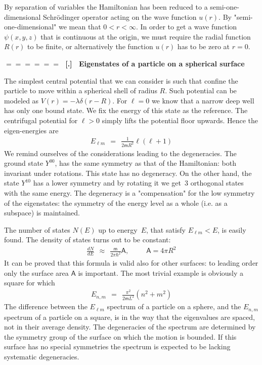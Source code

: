 \documentclass[onecolumn,fleqn]{revtex4}
\newcommand{\mass}{\mathsf{m}}
\newcommand{\beq}{\begin{eqnarray}}
\newcommand{\eeq}{\end{eqnarray}}
\renewcommand{\thesubsection}{\arabic{subsection}}
\renewcommand{\thesubsubsection}{\arabic{subsubsection}}
\newcommand{\sheadC}[1]
{
\addtocounter{subsubsection}{1}
\vspace{5mm}
{\Large\bf $=\!=\!=\!=\!=\!=\;$ [\thesubsection.\thesubsubsection] \ #1}  
\nopagebreak
\phantomsection
}
\begin{document}
By separation of variables the Hamiltonian has 
been reduced to a semi-one-dimensional Schr\"{o}dinger operator 
acting on the wave function ${u(r)}$.   
By "semi-one-dimensional" we mean that ${0<r<\infty}$.  
In order to get a wave function ${\psi(x,y,z)}$ 
that is continuous at the origin, we must require  
the radial function ${R(r)}$ to be finite, 
or alternatively the function ${u(r)}$ has to be 
zero at ${r=0}$. 



 
\sheadC{Eigenstates of a particle on a spherical surface}

The simplest central potential that we can consider 
is such that confine the particle to move within 
a spherical shell of radius $R$. Such potential 
can be modeled as ${V(r)=-\lambda\delta(r-R)}$. 
For ${\ell=0}$ we know that a narrow deep well has 
only one bound state. We fix the energy of this state 
as the reference. The centrifugal potential 
for ${\ell>0}$ simply lifts the potential 
floor upwards. Hence the eigen-energies are 
\beq
E_{\ell m} \ \  = \ \   \frac{1}{2\mass R^2} \ell(\ell+1) 
\eeq
We remind ourselves of the considerations leading 
to the degeneracies. The ground state ${Y^{00}}$, 
has the same symmetry as that of the Hamiltonian: 
both invariant under rotations. 
This state has no degeneracy. On the other hand, 
the state ${Y^{10}}$ has a lower symmetry and by rotating 
it we get~3 orthogonal states with the same energy. 
The degeneracy is a "compensation" for the low symmetry 
of the eigenstates: the symmetry of the energy level 
as a whole (i.e. as a subspace) is maintained. 


The number of states ${N(E)}$ up to energy~$E$, 
that satisfy ${E_{\ell m}<E}$, is easily found. 
The density of states turns out to be constant:
\beq
\frac{dN}{dE} \ \   \approx \ \   \frac{\mass}{2\pi\hbar^2}\mathsf{A}, 
\ \ \ \ \ \ \ \ \ \ \  \mathsf{A}=4\pi R^2
\eeq
It can be proved that this formula is valid also for 
other surfaces: to leading order only the surface area $\mathsf{A}$ 
is important.  The most trivial example is obviously a square for which 
\beq
E_{n,m} 
\ \  = \ \   
\frac{\pi^2 }{2\mass L^2} (n^2+m^2) 
\eeq
The difference between the $E_{\ell m}$ spectrum 
of a particle on a sphere, and the $E_{n,m}$ spectrum 
of a particle on a square, is in the way that 
the eigenvalues are spaced, not in their average density.
The degeneracies of the spectrum are determined 
by the symmetry group of the surface on which the motion 
is bounded. If this surface has no special symmetries 
the spectrum is expected to be lacking systematic degeneracies. 
 
\end{document}
